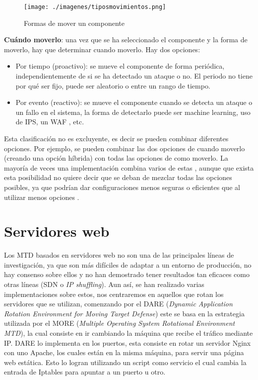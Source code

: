 \begin{figure}[h]
    \centering
    \texttt{[image: ./imagenes/tiposmovimientos.png]}
    \caption{Formas de mover un componente}
\end{figure}

\textbf{Cuándo moverlo}: una vez que se ha seleccionado el componente y la forma de moverlo, hay que determinar cuando moverlo. Hay dos opciones:
\begin{itemize}
    \item Por tiempo (proactivo): se mueve el componente de forma periódica, independientemente de si se ha detectado un ataque o no. El periodo no tiene por qué ser fijo, puede ser aleatorio o entre un rango de tiempo.
    \item Por evento (reactivo): se mueve el componente cuando se detecta un ataque o un fallo en el sistema, la forma de detectarlo puede ser machine learning\cite{MTD-ML}, uso de IPS\cite{Design-Generic-Intrusion-Tolerant-Architecture}, un WAF \cite{MTD-WAF}, etc.
\end{itemize}

Esta clasificación no es excluyente, es decir se pueden combinar diferentes opciones. Por ejemplo, se pueden combinar las dos opciones de cuando moverlo (creando una opción híbrida) con todas las opciones de como moverlo. La mayoría de veces una implementación combina varios de estas \cite{MTD-MORE+DARE+Java}\cite{MTD-DARE}\cite{MTD-arab}, aunque que exista esta posibilidad no quiere decir que se deban de mezclar todas las opciones posibles, ya que podrían dar configuraciones menos seguras o eficientes que al utilizar menos opciones \cite{MTD-comparativa-gorda}.

\section{Servidores web}
Los MTD basados en servidores web no son una de las principales líneas de investigación, ya que son más difíciles de adaptar a un entorno de producción, no hay consenso sobre ellos y no han demostrado tener resultados tan eficaces como otras líneas (SDN o \textit{IP shuffling}). Aun así, se han realizado varias implementaciones sobre estos, nos centraremos en aquellos que rotan los servidores que se utilizan, comenzando por el DARE (\textit{Dynamic Application Rotation Environment for Moving Target Defense}) este se basa en la estrategia utilizada por el MORE (\textit{Multiple Operating System Rotational Environment MTD})\cite{MORE}, la cual consiste en ir cambiando la máquina que recibe el tráfico mediante IP. DARE lo implementa en los puertos, esta consiste en rotar un servidor Nginx\cite{nginx} con uno Apache\cite{apache}, los cuales están en la misma máquina, para servir una página web estática. Esto lo logran utilizando un script como servicio el cual cambia la entrada de Iptables\cite{iptables} para apuntar a un puerto u otro.

